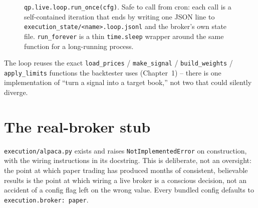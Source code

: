\begin{figure}[h]
\centering
{}
\caption{\texttt{qp.live.loop.run\_once(cfg)}. Safe to call from cron:
each call is a self-contained iteration that ends by writing one JSON line to
\texttt{execution\_state/<name>.loop.jsonl} and the broker's own state file.
\texttt{run\_forever} is a thin \texttt{time.sleep} wrapper around the same
function for a long-running process.}
\end{figure}

The loop reuses the exact \texttt{load\_prices} / \texttt{make\_signal} /
\texttt{build\_weights} / \texttt{apply\_limits} functions the backtester uses
(Chapter~1) -- there is one implementation of ``turn a signal into a target
book,'' not two that could silently diverge.

\section{The real-broker stub}

\texttt{execution/alpaca.py} exists and raises \texttt{NotImplementedError} on
construction, with the wiring instructions in its docstring. This is deliberate,
not an oversight: the point at which paper trading has produced months of
consistent, believable results is the point at which wiring a live broker is a
conscious decision, not an accident of a config flag left on the wrong value.
Every bundled config defaults to \texttt{execution.broker: paper}.
